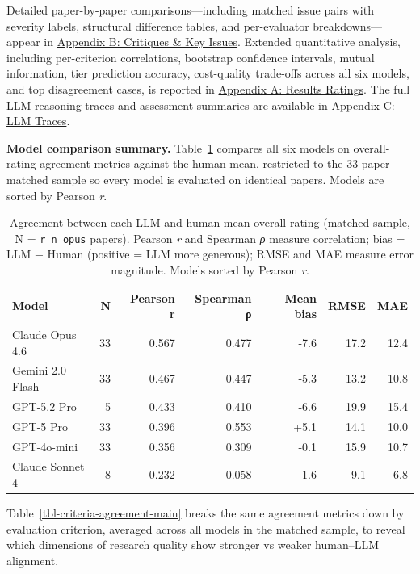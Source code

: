 \documentclass[
  11pt,
  letterpaper,
]{article}
\begin{document}
Detailed paper-by-paper comparisons---including matched issue pairs with
severity labels, structural difference tables, and per-evaluator
breakdowns---appear in \href{results_critiques.qmd}{Appendix B:
Critiques \& Key Issues}. Extended quantitative analysis, including
per-criterion correlations, bootstrap confidence intervals, mutual
information, tier prediction accuracy, cost-quality trade-offs across
all six models, and top disagreement cases, is reported in
\href{results_ratings.qmd}{Appendix A: Results Ratings}. The full LLM
reasoning traces and assessment summaries are available in
\href{appendix_llm_traces.qmd}{Appendix C: LLM Traces}.

\textbf{Model comparison summary.} Table~\ref{tbl-model-agreement-main}
compares all six models on overall-rating agreement metrics against the
human mean, restricted to the 33-paper matched sample so every model is
evaluated on identical papers. Models are sorted by Pearson \emph{r}.

\begin{longtable}[]{@{}lrrrrrr@{}}

\caption{\label{tbl-model-agreement-main}Agreement between each LLM and
human mean overall rating (matched sample, N = \texttt{r\ n\_opus}
papers). Pearson \emph{r} and Spearman \emph{ρ} measure correlation;
bias = LLM − Human (positive = LLM more generous); RMSE and MAE measure
error magnitude. Models sorted by Pearson \emph{r}.}

\tabularnewline

\toprule\noalign{}
Model & N & Pearson r & Spearman ρ & Mean bias & RMSE & MAE \\
\midrule\noalign{}
\endhead
\bottomrule\noalign{}
\endlastfoot
Claude Opus 4.6 & 33 & 0.567 & 0.477 & -7.6 & 17.2 & 12.4 \\
Gemini 2.0 Flash & 33 & 0.467 & 0.447 & -5.3 & 13.2 & 10.8 \\
GPT-5.2 Pro & 5 & 0.433 & 0.410 & -6.6 & 19.9 & 15.4 \\
GPT-5 Pro & 33 & 0.396 & 0.553 & +5.1 & 14.1 & 10.0 \\
GPT-4o-mini & 33 & 0.356 & 0.309 & -0.1 & 15.9 & 10.7 \\
Claude Sonnet 4 & 8 & -0.232 & -0.058 & -1.6 & 9.1 & 6.8 \\

\end{longtable}

Table~\ref{tbl-criteria-agreement-main} breaks the same agreement
metrics down by evaluation criterion, averaged across all models in the
matched sample, to reveal which dimensions of research quality show
stronger vs weaker human--LLM alignment.
\end{document}
